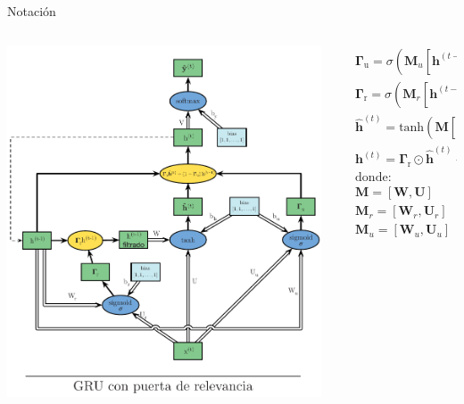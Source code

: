 \documentclass[aspectratio=169]{beamer}
\begin{document}
\begin{frame}{Notación}
	\begin{columns}
		\begin{column}{0.4\textwidth}
			\includegraphics[width=\textwidth, center]{imgs/tema4/rnn/GRUrele.pdf}
		\end{column}

		\begin{column}{0.6\textwidth}
			\begin{equation*}
				\begin{aligned}
				& \boldsymbol{\Gamma}_{\mathrm{u}} = \sigma(\mathbf{M}_{u}[\mathbf{h}^{(t-1), \mathbf{x}^{(t)}}]+\mathbf{b}_{u})\\
				& \boldsymbol{\Gamma}_{\mathrm{r}} = \sigma(\mathbf{M}_{r}[\mathbf{h}^{(t-1), \mathbf{x}^{(t)}}]+\mathbf{b}_{r})\\
				& \boldsymbol{\hat{h}}^{(t)} = \text{tanh}(\mathbf{M}[\boldsymbol{\Gamma}_{\mathrm{r}}\odot\mathbf{h}^{(t-1)}, \mathbf{x}^{(t)}]+\mathbf{b}_{h}) \\
				& \boldsymbol{h}^{(t)} = \boldsymbol{\Gamma}_{\mathrm{r}}\odot\mathbf{\hat{h}}^{(t)}+(1-\boldsymbol{\Gamma}_{\mathrm{u}}) \odot \mathbf{h}^{(t-1)} \\[5px]
				& \text{donde:} \\[5px]
				& \mathbf{M} = [\mathbf{W}, \mathbf{U}] \\
				& \mathbf{M}_{r} = [\mathbf{W}_{r}, \mathbf{U}_{r}] \\
				& \mathbf{M}_{u} = [\mathbf{W}_{u}, \mathbf{U}_{u}] \\
				\end{aligned}
			\end{equation*}
		\end{column}
	\end{columns}
\end{frame}
\end{document}

